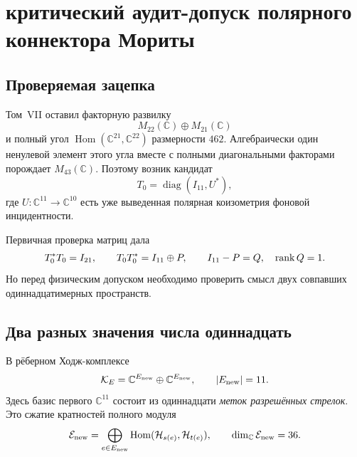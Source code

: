 \chapter{критический аудит-допуск полярного коннектора Мориты}
\label{ch:v8-polar-morita-connector-admission-gate}

\section{Проверяемая зацепка}

Том~VII оставил факторную развилку
\begin{equation}
 M_{22}(\mathbb C)\oplus M_{21}(\mathbb C)
\end{equation}
и полный угол $\operatorname{Hom}(\mathbb C^{21},\mathbb C^{22})$
размерности $462$. Алгебраически один ненулевой элемент этого угла вместе
с полными диагональными факторами порождает $M_{43}(\mathbb C)$. Поэтому
возник кандидат
\begin{equation}
 T_0=\operatorname{diag}(I_{11},U^*),
 \label{eq:v8-polar-formal-connector}
\end{equation}
где $U:\mathbb C^{11}\to\mathbb C^{10}$ есть уже выведенная полярная
коизометрия фоновой инцидентности.

Первичная проверка матриц дала
\begin{equation}
 T_0^*T_0=I_{21},\qquad
 T_0T_0^*=I_{11}\oplus P,
 \qquad I_{11}-P=Q,\quad\operatorname{rank} Q=1.
\end{equation}
Но перед физическим допуском необходимо проверить смысл двух совпавших
одиннадцатимерных пространств.

\section{Два разных значения числа одиннадцать}

В рёберном Ходж-комплексе
\begin{equation}
 \mathcal K_E=\mathbb C^{E_{\rm new}}\oplus
              \mathbb C^{E_{\rm new}},
 \qquad |E_{\rm new}|=11.
 \label{eq:v8-polar-edge-label-space}
\end{equation}
Здесь базис первого $\mathbb C^{11}$ состоит из одиннадцати \emph{меток
разрешённых стрелок}. Это сжатие кратностей полного модуля
\begin{equation}
 \mathcal E_{\rm new}
 =\bigoplus_{e\in E_{\rm new}}
   \operatorname{Hom}(\mathcal H_{s(e)},\mathcal H_{t(e)}),
 \qquad \dim_{\mathbb C}\mathcal E_{\rm new}=36.
 \label{eq:v8-polar-full-arrow-module}
\end{equation}

